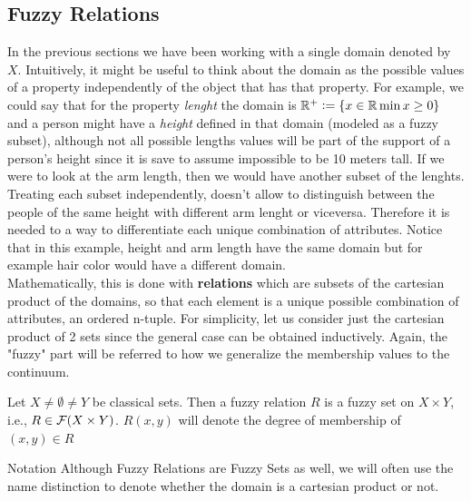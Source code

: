 \subsection{Fuzzy Relations}

In the previous sections we have been working with a single domain denoted by $X$. Intuitively, it might be useful to think about the domain as the possible values of a property independently of the object that has that property. For example, we could say that for the property \textit{lenght} the domain is $\mathbb{R}^+\mathrel{\mathop:}=
\{x\in\mathbb{R} \min x \geq 0\}$ and a person might have a \textit{height} defined in that domain (modeled as a fuzzy subset), although not all possible lengths values will be part of the support of a person's height since it is save to assume impossible to be 10 meters tall. If we were to look at the arm length, then we would have another subset of the lenghts. Treating each subset independently, doesn't allow to distinguish between the people of the same height with different arm lenght or viceversa. Therefore it is needed to a way to differentiate each unique combination of attributes. Notice that in this example, height and arm length have the same domain but for example hair color would have a different domain.\\

Mathematically, this is done with \textbf{relations} which are subsets of the cartesian product of the domains, so that each element is a unique possible combination of attributes, an ordered n-tuple. For simplicity, let us consider just the cartesian product of 2 sets since the general case can be obtained inductively. Again, the "fuzzy" part will be referred to how we generalize the membership values to the continuum.\\


\begin{definition}
  Let $X\neq \emptyset \neq Y$ be classical sets. Then a fuzzy relation $R$ is a fuzzy set on $X\times Y$, i.e., $R\in \mathcal{F}(X\times Y)$. $R(x,y)$ will denote the degree of membership of $(x,y) \in R$
\end{definition}

\begin{notation}[label={not:compositionFS}]{Notation}
  Although Fuzzy Relations are Fuzzy Sets as well, we will often use the name distinction to denote whether the domain is a cartesian product or not.
\end{notation}

